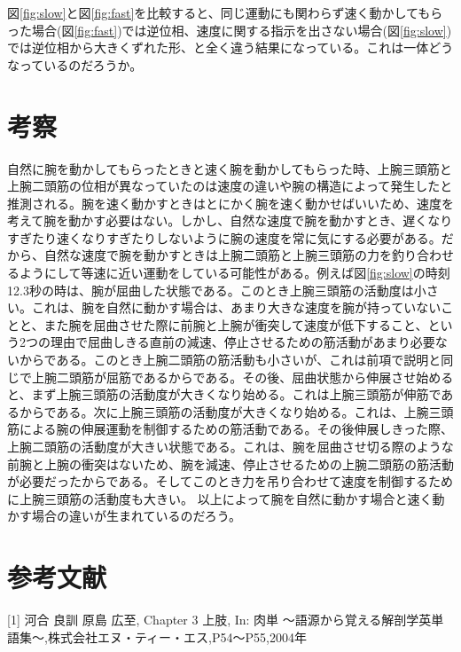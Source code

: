 \documentclass{jsarticle}
\begin{document}
図\ref{fig:slow}と図\ref{fig:fast}を比較すると、同じ運動にも関わらず速く動かしてもらった場合(図\ref{fig:fast})では逆位相、速度に関する指示を出さない場合(図\ref{fig:slow})では逆位相から大きくずれた形、と全く違う結果になっている。これは一体どうなっているのだろうか。

\section{考察}
自然に腕を動かしてもらったときと速く腕を動かしてもらった時、上腕三頭筋と上腕二頭筋の位相が異なっていたのは速度の違いや腕の構造によって発生したと推測される。腕を速く動かすときはとにかく腕を速く動かせばいいため、速度を考えて腕を動かす必要はない。しかし、自然な速度で腕を動かすとき、遅くなりすぎたり速くなりすぎたりしないように腕の速度を常に気にする必要がある。だから、自然な速度で腕を動かすときは上腕二頭筋と上腕三頭筋の力を釣り合わせるようにして等速に近い運動をしている可能性がある。例えば図\ref{fig:slow}の時刻12.3秒の時は、腕が屈曲した状態である。このとき上腕三頭筋の活動度は小さい。これは、腕を自然に動かす場合は、あまり大きな速度を腕が持っていないことと、また腕を屈曲させた際に前腕と上腕が衝突して速度が低下すること、という2つの理由で屈曲しきる直前の減速、停止させるための筋活動があまり必要ないからである。このとき上腕二頭筋の筋活動も小さいが、これは前項で説明と同じで上腕二頭筋が屈筋であるからである。その後、屈曲状態から伸展させ始めると、まず上腕三頭筋の活動度が大きくなり始める。これは上腕三頭筋が伸筋であるからである。次に上腕三頭筋の活動度が大きくなり始める。これは、上腕三頭筋による腕の伸展運動を制御するための筋活動である。その後伸展しきった際、上腕二頭筋の活動度が大きい状態である。これは、腕を屈曲させ切る際のような前腕と上腕の衝突はないため、腕を減速、停止させるための上腕二頭筋の筋活動が必要だったからである。そしてこのとき力を吊り合わせて速度を制御するために上腕三頭筋の活動度も大きい。
以上によって腕を自然に動かす場合と速く動かす場合の違いが生まれているのだろう。

\section*{参考文献}
[1] 河合 良訓 原島 広至, Chapter 3 上肢, In: 肉単 〜語源から覚える解剖学英単語集〜,株式会社エヌ・ティー・エス,P54〜P55,2004年
\end{document}
